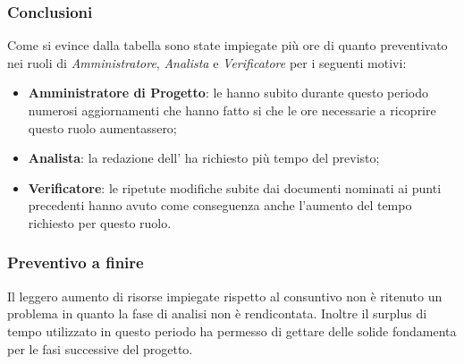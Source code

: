 \subsubsection{Conclusioni}
Come si evince dalla tabella sono state impiegate più ore di quanto preventivato nei ruoli di \textit{Amministratore}, \textit{Analista} e \textit{Verificatore} per i seguenti motivi:
\begin{itemize}
    \item \textbf{Amministratore di Progetto}: le  hanno subito durante questo periodo numerosi aggiornamenti che hanno fatto si che le ore necessarie a ricoprire questo ruolo aumentassero;
    \item \textbf{Analista}: la redazione dell' ha richiesto più tempo del previsto;
    \item \textbf{Verificatore}: le ripetute modifiche subite dai documenti nominati ai punti precedenti hanno avuto come conseguenza anche l'aumento del tempo richiesto per questo ruolo.
\end{itemize}

\subsubsection{Preventivo a finire}
Il leggero aumento di risorse impiegate rispetto al consuntivo non è ritenuto un problema in quanto la fase di analisi non è rendicontata. Inoltre il surplus di tempo utilizzato in questo periodo ha permesso di gettare delle solide fondamenta per le fasi successive del progetto.
